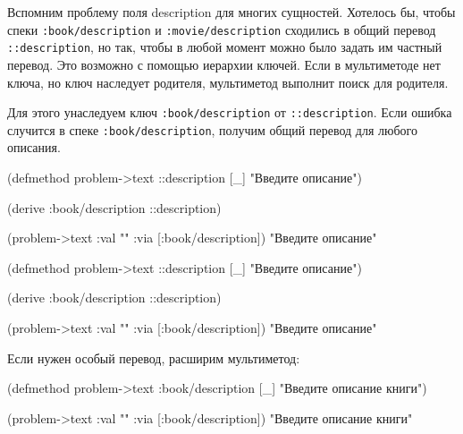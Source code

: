 
Вспомним проблему поля description для многих сущностей. Хотелось бы, чтобы
спеки \verb|:book/description| и \verb|:movie/description| сходились в общий
перевод \verb|::description|, но так, чтобы в любой момент можно было задать им
частный перевод. Это возможно с помощью иерархии ключей. Если в мультиметоде нет
ключа, но ключ наследует родителя, мультиметод выполнит поиск для родителя.

\mnoindent
Для этого унаследуем ключ \verb|:book/description| от
\verb|::description|. Если ошибка случится в спеке \verb|:book/description|,
получим общий перевод для любого описания.


\ifx\DEVICETYPE\MOBILE

  \begin{clojure}
(defmethod problem->text
  ::description [_] "Введите описание")

(derive :book/description ::description)

(problem->text
  {:val "" :via [:book/description]})
"Введите описание"
  \end{clojure}

\else

  \begin{clojure}
(defmethod problem->text ::description [_]
  "Введите описание")

(derive :book/description ::description)

(problem->text {:val "" :via [:book/description]})
"Введите описание"
  \end{clojure}

\fi

\noindent
Если нужен особый перевод, расширим мультиметод:

\ifx\DEVICETYPE\MOBILE

  \begin{clojure}
(defmethod problem->text
  :book/description [_]
  "Введите описание книги")

(problem->text
  {:val "" :via [:book/description]})
"Введите описание книги"
  \end{clojure}

